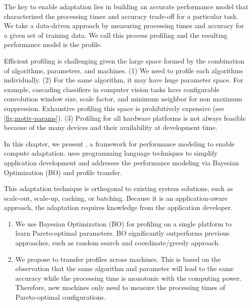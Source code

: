 The key to enable adaptation lies in building an accurate performance model that
characterized the processing times and accuracy trade-off for a particular
task. We take a data-driven approach by measuring processing times and accuracy
for a given set of training data. We call this process profiling and the
resulting performance model is the profile.

Efficient profiling is challenging given the large space formed by the
combination of algorithms, parameters, and machines. (1) We need to profile each
algorithms individually. (2) For the same algorithm, it may have huge parameter
space. For example, cascading classifiers in computer vision tasks have
configurable convolution window size, scale factor, and minimum neighbor for non
maximum suppression. Exhaustive profiling this space is prohibitively expensive
(see \autoref{fig:motiv-params}). (3) Profiling for all hardware platforms is
not always feasible because of the many devices and their availability at
development time.


In this chapter, we present \brt{}, a framework for performance modeling to
enable compute adaptation. \brt{} uses programming language techniques to
simplify application development and addresses the performance modeling via
Bayesian Optimization (BO) and profile transfer.

This adaptation technique is orthogonal to existing system solutions, such as
scale-out, scale-up, caching, or batching. Because it is an application-aware
approach, the adaptation requires knowledge from the application developer.

\begin{enumerate}[leftmargin=*, topsep=5pt, itemsep=5pt]
\item We use Bayesian Optimization (BO) for profiling on a single platform to
  learn Pareto-optimal parameters. BO significantly outperforms previous
  approaches, such as random search and coordinate/greedy approach.
\item We propose to transfer profiles across machines. This is based on the
  observation that the same algorithm and parameter will lead to the same
  accuracy while the processing time is monotonic with the computing
  power. Therefore, new machines only need to measure the processing times of
  Pareto-optimal configurations.
\end{enumerate}


